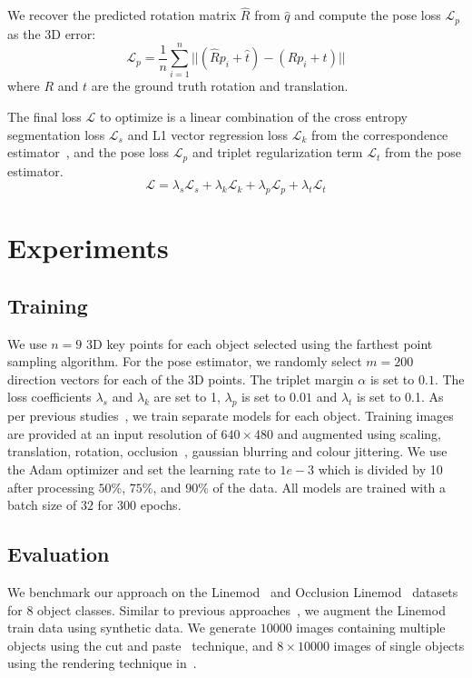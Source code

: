 \documentclass{article}
\newcommand{\Lagr}{\mathcal{L}}
\begin{document}
We recover the predicted rotation matrix $\hat{R}$ from $\hat{q}$ and compute the pose loss $\Lagr_p$ as the 3D error:
\begin{equation}
\Lagr_p = \frac{1}{n} \sum_{i=1}^{n} ||(\hat{R}p_i + \hat{t}) - (Rp_i + t) || 
\end{equation}
where $R$ and $t$ are the ground truth rotation and translation.

The final loss $\Lagr$ to optimize is a linear combination of the cross entropy segmentation loss $\Lagr_s$ and L1 vector regression loss $\Lagr_k$ from the correspondence estimator~\cite{peng2019pvnet}, and the pose loss $\Lagr_p$ and triplet regularization term $\Lagr_t$ from the pose estimator.
\begin{equation}
\Lagr = \lambda_s\Lagr_s + \lambda_k\Lagr_k + \lambda_p\Lagr_p + \lambda_t\Lagr_t
\end{equation}



\section{Experiments}









\subsection{Training}

We use $n=9$ 3D key points for each object selected using the farthest point sampling algorithm. For the pose estimator, we randomly select $m=200$ direction vectors for each of the 3D points. The triplet margin $\alpha$ is set to $0.1$. The loss coefficients $\lambda_s$ and $\lambda_k$ are set to 1, $\lambda_p$ is set to $0.01$ and $\lambda_t$ is set to 0.1. As per previous studies~\cite{peng2019pvnet}\cite{hu2020single}, we train separate models for each object. Training images are provided at an input resolution of $640 \times 480$ and augmented using scaling, translation, rotation, occlusion~\cite{zhong2020random}, gaussian blurring and colour jittering. We use the Adam optimizer and set the learning rate to $1e-3$ which is divided by 10 after processing $50\%$, $75\%$, and $90\%$ of the data. All models are trained with a batch size of $32$ for $300$ epochs.


\subsection{Evaluation}
We benchmark our approach on the Linemod~\cite{linemod} and Occlusion Linemod~\cite{occlusionlinemod} datasets for 8 object classes. Similar to previous approaches~\cite{peng2019pvnet}\cite{hu2020single}, we augment the Linemod train data using synthetic data. We generate $10000$ images containing multiple objects using the cut and paste~\cite{dwibedi2017cut} technique, and $8\times10000$ images of single objects using the rendering technique in~\cite{peng2019pvnet}. 
\end{document}
